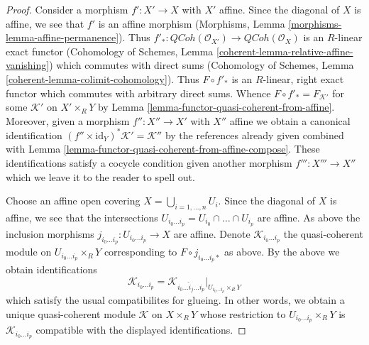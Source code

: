 \documentclass[10pt,a4paper]{amsart}
\theoremstyle{plain}
\theoremstyle{definition}
\theoremstyle{remark}
\numberwithin{equation}{subsection}
\def\QCoh{\mathit{QCoh}}
\begin{document}
\begin{proof}
Consider a morphism $f' : X' \to X$ with $X'$ affine. Since the
diagonal of $X$ is affine, we see that $f'$ is an affine morphism
(Morphisms, Lemma \ref{morphisms-lemma-affine-permanence}).
Thus $f'_* : \QCoh(\mathcal{O}_{X'}) \to \QCoh(\mathcal{O}_X)$
is an $R$-linear exact functor
(Cohomology of Schemes, Lemma \ref{coherent-lemma-relative-affine-vanishing})
which commutes with direct sums
(Cohomology of Schemes, Lemma \ref{coherent-lemma-colimit-cohomology}).
Thus $F \circ f'_*$ is an $R$-linear, right exact functor which commutes
with arbitrary direct sums. Whence
$F \circ f'_* = F_{\mathcal{K}'}$ for some $\mathcal{K}'$
on $X' \times_R Y$ by Lemma \ref{lemma-functor-quasi-coherent-from-affine}.
Moreover, given a morphism $f'' : X'' \to X'$ with $X''$ affine
we obtain a canonical identification
$(f'' \times \text{id}_Y)^*\mathcal{K}' = \mathcal{K}''$
by the references already given combined with
Lemma \ref{lemma-functor-quasi-coherent-from-affine-compose}.
These identifications satisfy a cocycle condition given
another morphism $f''' : X''' \to X''$ which we leave it to
the reader to spell out.

\medskip\noindent
Choose an affine open covering $X = \bigcup_{i = 1, \ldots, n} U_i$.
Since the diagonal of $X$ is affine, we see that the intersections
$U_{i_0 \ldots i_p} = U_{i_0} \cap \ldots \cap U_{i_p}$ are affine.
As above the inclusion morphisms
$j_{i_0 \ldots i_p} : U_{i_0 \ldots i_p} \to X$ are affine.
Denote $\mathcal{K}_{i_0 \ldots i_p}$ the quasi-coherent module
on $U_{i_0 \ldots i_p} \times_R Y$ corresponding to
$F \circ j_{i_0 \ldots i_p *}$ as above.
By the above we obtain identifications
$$
\mathcal{K}_{i_0 \ldots i_p} =
\mathcal{K}_{i_0 \ldots \hat i_j \ldots i_p}|_{U_{i_0 \ldots i_p} \times_R Y}
$$
which satisfy the usual compatibilites for glueing. In other words, we obtain
a unique quasi-coherent module $\mathcal{K}$ on $X \times_R Y$
whose restriction to $U_{i_0 \ldots i_p} \times_R Y$ is
$\mathcal{K}_{i_0 \ldots i_p}$ compatible with the displayed identifications.


\end{proof}
\end{document}
